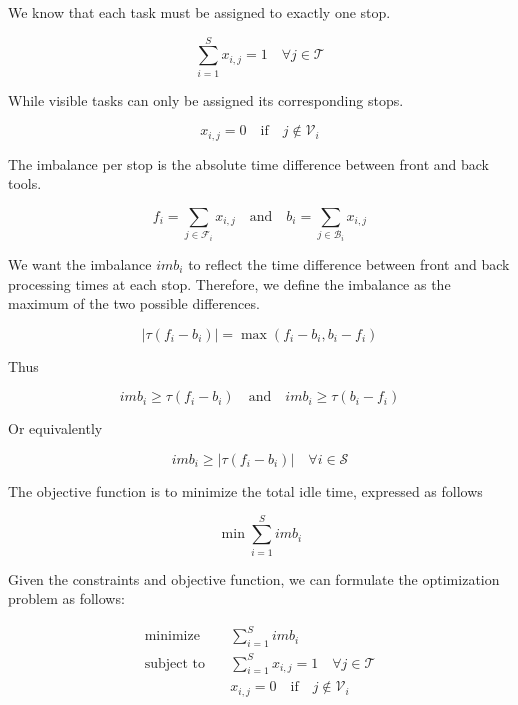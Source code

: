 We know that each task must be assigned to exactly one stop.

\begin{equation}
    \sum_{i=1}^{S} x_{i,j} = 1 \quad \forall j \in \mathcal{T}
\end{equation}

While visible tasks can only be assigned its corresponding stops.

\begin{equation}
    x_{i,j} = 0 \quad \text{if} \quad j \notin \mathcal{V}_i
\end{equation}

The imbalance per stop is the absolute time difference between front and back tools.

\begin{equation}
    f_i = \sum_{j \in \mathcal{F}_i} x_{i,j} \quad \text{and} \quad b_i = \sum_{j \in \mathcal{B}_i} x_{i,j}
\end{equation}

We want the imbalance ${imb}_i$ to reflect the time difference between front and back processing times at each stop. Therefore, we define the imbalance as the maximum of the two possible differences.

\begin{equation}
    \left| \tau (f_i - b_i) \right| = \max \left( f_i - b_i, b_i - f_i \right)
\end{equation}

Thus

\begin{equation}
    {imb}_i \geq \tau \left(f_i - b_i\right) \quad \text{and} \quad {imb}_i \geq \tau \left(b_i - f_i\right)
\end{equation}

Or equivalently

\begin{equation}
    {imb}_i \geq \left| \tau (f_i - b_i) \right| \quad \forall i \in \mathcal{S}
\end{equation}

The objective function is to minimize the total idle time, expressed as follows

\begin{equation}
    \min \sum_{i=1}^{S} {imb}_i
\end{equation}

Given the constraints and objective function, we can formulate the optimization problem as follows:

\begin{equation}
    \begin{aligned}
        \text{minimize} & \quad \sum_{i=1}^{S} {imb}_i \\
        \text{subject to} & \quad \sum_{i=1}^{S} x_{i,j} = 1 \quad \forall j \in \mathcal{T} \\
                          & \quad x_{i,j} = 0 \quad \text{if} \quad j \notin \mathcal{V}_i
    \end{aligned}
\end{equation}

